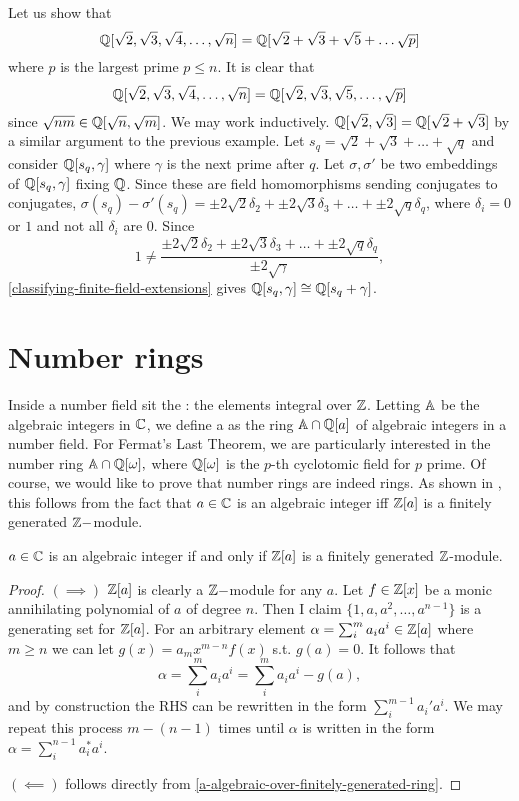 \begin{example}
Let us show that $$\mathbb{Q}[\sqrt{2},\sqrt{3},\sqrt{4},\dots,\sqrt{n}]=\mathbb{Q}[\sqrt{2}+\sqrt{3}+\sqrt{5}+\dots\sqrt{p}]$$ where $p$ is the largest prime $p\leq n$. It is clear that $$\mathbb{Q}[\sqrt{2},\sqrt{3},\sqrt{4},\dots,\sqrt{n}]=\mathbb{Q}[\sqrt{2},\sqrt{3},\sqrt{5},\dots,\sqrt{p}]$$ since $\sqrt{nm}\in \mathbb{Q}[\sqrt{n},\sqrt{m}]$. We may work inductively. $\mathbb{Q}[\sqrt{2},\sqrt{3}]=\mathbb{Q}[\sqrt{2}+\sqrt{3}]$ by a similar argument to the previous example. Let $s_q=\sqrt{2}+\sqrt{3}+\dots+\sqrt{q}$ and consider $\mathbb{Q}[s_q,\gamma]$ where $\gamma$ is the next prime after $q$. Let $\sigma,\sigma'$ be two embeddings of $\mathbb{Q}[s_q,\gamma]$ fixing $\mathbb{Q}$. Since these are field homomorphisms sending conjugates to conjugates, $\sigma(s_q)-\sigma'(s_q)=\pm 2 \sqrt{2}\delta_2+\pm 2\sqrt{3}\delta_3+\dots+\pm 2\sqrt{q}\delta_q$, where $\delta_i=0$ or $1$ and not all $\delta_i$ are $0$. Since $$1\neq \frac{\pm 2\sqrt{2}\delta_2+\pm2 \sqrt{3}\delta_3+\dots+\pm 2\sqrt{q}\delta_q}{\pm 2\sqrt{\gamma}},$$
\cref{classifying-finite-field-extensions} gives $\mathbb{Q}[s_q,\gamma]\cong \mathbb{Q}[s_q+\gamma]$.
\end{example}

\section{Number rings}
Inside a number field sit the : the elements integral over $\mathbb{Z}$. Letting $\mathbb{A}$ be the algebraic integers in $\mathbb{C}$, we define a  as the ring $\mathbb{A}\cap \mathbb{Q}[a]$ of algebraic integers in a number field. For Fermat's Last Theorem, we are particularly interested in the number ring $\mathbb{A}\cap \mathbb{Q}[\omega],$ where $\mathbb{Q}[\omega]$ is the $p$-th cyclotomic field for $p$ prime. Of course, we would like to prove that number rings are indeed rings. As shown in \cite{NumberFields}, this follows from the fact that $a\in \mathbb{C}$ is an algebraic integer iff $\mathbb{Z}[a]$ is a finitely generated $\mathbb{Z}-$module.
\begin{proposition}\label{algebraic-int-iff-finitely-generated}
$a\in \mathbb{C}$ is an algebraic integer if and only if $\mathbb{Z}[a]$ is a finitely generated $\mathbb{Z}$-module.
\end{proposition}
\begin{proof}
$(\implies)$ $\mathbb{Z}[a]$ is clearly a $\mathbb{Z}-$module for any $a$. Let $f\in \mathbb{Z}[x]$ be a monic annihilating polynomial of $a$ of degree $n$. Then I claim $\{1,a,a^2,\dots,a^{n-1}\}$ is a generating set for $\mathbb{Z}[a]$. For an arbitrary element $\alpha=\sum_i^m a_ia^i\in \mathbb{Z}[a]$ where $m\geq n$ we can let $g(x)=a_mx^{m-n}f(x)$ s.t. $g(a)=0$. It follows that $$\alpha=\sum_i^{m}a_ia^i=\sum_i^{m}a_ia^i-g(a),$$ and by construction the RHS can be rewritten in the form $\sum_i^{m-1}a_i'a^i$. We may repeat this process $m-(n-1)$ times until $\alpha$ is written in the form $\alpha=\sum_i^{n-1} a_i^*a^i$.

$(\impliedby)$ follows directly from \cref{a-algebraic-over-finitely-generated-ring}.
\end{proof}


